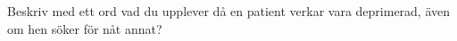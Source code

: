 \documentclass[english]{beamer}
\begin{document}

\begin{frame}
\textcolor{lila}{Beskriv med ett ord vad du upplever då en patient verkar vara deprimerad, även om hen söker för nåt annat?}
\end{frame}
\end{document}
